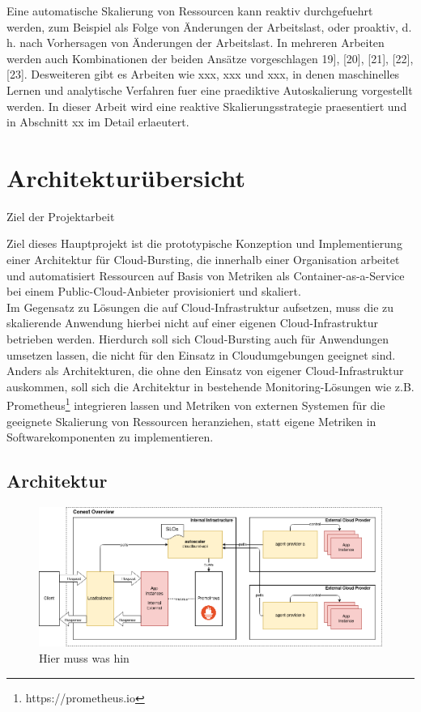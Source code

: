 \documentclass[runningheads]{llncs}
\begin{document}
Eine automatische Skalierung von Ressourcen kann reaktiv durchgefuehrt werden, zum Beispiel als Folge von Änderungen der Arbeitslast, oder proaktiv, d. h. nach Vorhersagen von Änderungen der Arbeitslast. In mehreren Arbeiten werden auch Kombinationen der beiden Ansätze vorgeschlagen 19], [20], [21], [22], [23]. Desweiteren gibt es Arbeiten wie xxx, xxx und xxx, in denen maschinelles Lernen und analytische Verfahren fuer eine praediktive Autoskalierung vorgestellt werden. In dieser Arbeit wird eine reaktive Skalierungsstrategie praesentiert und in Abschnitt xx im Detail erlaeutert.
	
\section{Architekturübersicht}{Ziel der Projektarbeit}
	
Ziel dieses Hauptprojekt ist die prototypische Konzeption und Implementierung einer Architektur für Cloud-Bursting, die innerhalb einer Organisation arbeitet und automatisiert Ressourcen auf Basis von Metriken als Container-as-a-Service bei einem Public-Cloud-Anbieter provisioniert und skaliert. \\
	
Im Gegensatz zu Lösungen die auf Cloud-Infrastruktur aufsetzen, muss die zu skalierende Anwendung hierbei nicht auf einer eigenen Cloud-Infrastruktur betrieben werden. Hierdurch soll sich Cloud-Bursting auch für Anwendungen umsetzen lassen, die nicht für den Einsatz in Cloudumgebungen geeignet sind. Anders als Architekturen, die ohne den Einsatz von eigener Cloud-Infrastruktur auskommen, soll sich die Architektur in bestehende Monitoring-Lösungen wie z.B. Prometheus\footnote{https://prometheus.io} integrieren lassen und Metriken von externen Systemen für die geeignete Skalierung von Ressourcen heranziehen, statt eigene Metriken in Softwarekomponenten zu implementieren.
	
\subsection{Architektur}
	
\begin{figure}[h]
	\centering
	\includegraphics[width=1.0\linewidth,scale=1.0]{images/context.png}
	\caption{Hier muss was hin}
\end{figure}
\end{document}
